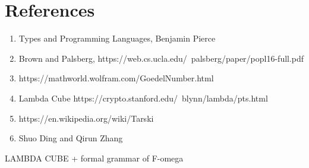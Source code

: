 \documentclass{article}
\begin{document}
\section{References}
\begin{enumerate}
    \item Types and Programming Languages, Benjamin Pierce
    \item Brown and Palsberg, https://web.cs.ucla.edu/~palsberg/paper/popl16-full.pdf
    \item https://mathworld.wolfram.com/GoedelNumber.html
    \item Lambda Cube https://crypto.stanford.edu/~blynn/lambda/pts.html
    \item https://en.wikipedia.org/wiki/Tarski%
    \item Shuo Ding and Qirun Zhang
\end{enumerate}

\appendixpage
LAMBDA CUBE + formal grammar of F-omega
\end{document}

